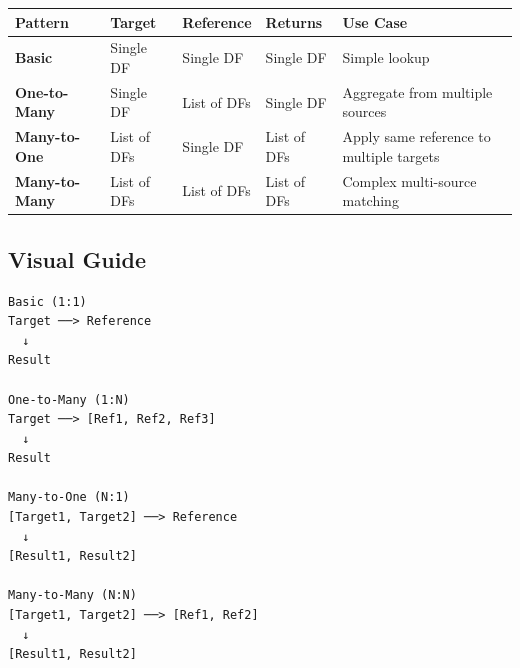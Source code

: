 \documentclass[
  letterpaper,
]{scrbook}
\begin{document}
\begin{longtable}[]{@{}
  >{\raggedright\arraybackslash}p{}
  >{\raggedright\arraybackslash}p{}
  >{\raggedright\arraybackslash}p{}
  >{\raggedright\arraybackslash}p{}
  >{\raggedright\arraybackslash}p{}@{}}
\toprule\noalign{}
\begin{minipage}[b]{\linewidth}\raggedright
Pattern
\end{minipage} & \begin{minipage}[b]{\linewidth}\raggedright
Target
\end{minipage} & \begin{minipage}[b]{\linewidth}\raggedright
Reference
\end{minipage} & \begin{minipage}[b]{\linewidth}\raggedright
Returns
\end{minipage} & \begin{minipage}[b]{\linewidth}\raggedright
Use Case
\end{minipage} \\
\midrule\noalign{}
\endhead
\bottomrule\noalign{}
\endlastfoot
\textbf{Basic} & Single DF & Single DF & Single DF & Simple lookup \\
\textbf{One-to-Many} & Single DF & List of DFs & Single DF & Aggregate
from multiple sources \\
\textbf{Many-to-One} & List of DFs & Single DF & List of DFs & Apply
same reference to multiple targets \\
\textbf{Many-to-Many} & List of DFs & List of DFs & List of DFs &
Complex multi-source matching \\
\end{longtable}

\subsection{Visual Guide}\label{visual-guide}

\begin{verbatim}
Basic (1:1)
Target ──> Reference
  ↓
Result

One-to-Many (1:N)
Target ──> [Ref1, Ref2, Ref3]
  ↓
Result

Many-to-One (N:1)
[Target1, Target2] ──> Reference
  ↓
[Result1, Result2]

Many-to-Many (N:N)
[Target1, Target2] ──> [Ref1, Ref2]
  ↓
[Result1, Result2]
\end{verbatim}
\end{document}
